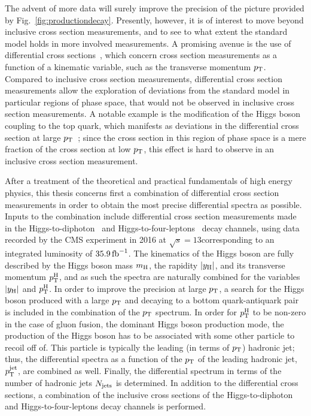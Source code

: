 The advent of more data will surely improve the precision of the picture provided by Fig.~\ref{fig:productiondecay}.
% 
Presently, however, it is of interest to move beyond inclusive cross section measurements, and to see to what extent the standard model holds in more involved measurements.
% 
A promising avenue is the use of differential cross sections~\cite{Aad:2014lwa,Khachatryan:2015rxa,Aad:2014tca,Khachatryan:2015yvw,Aad:2016lvc,Khachatryan:2016vnn,Aaboud:2018xdt,Sirunyan:2018kta,Aaboud:2017oem,Sirunyan:2017exp,Aaboud:2018ezd}, which concern cross section measurements as a function of a kinematic variable, such as the transverse momentum $p_\mathrm{T}$.
% 
Compared to inclusive cross section measurements, differential cross section measurements allow the exploration of deviations from the standard model in particular regions of phase space, that would not be observed in inclusive cross section measurements.
% 
A notable example is the modification of the Higgs boson coupling to the top quark, which manifests as deviations in the differential cross section at large $p_\mathrm{T}$~\cite{Grazzini:2017szg,Grazzini:2016paz}; since the cross section in this region of phase space is a mere fraction of the cross section at low $p_\mathrm{T}$, this effect is hard to observe in an inclusive cross section measurement.


After a treatment of the theoretical and practical fundamentals of high energy physics, this thesis concerns first a combination of differential cross section measurements in order to obtain the most precise differential spectra as possible.
% 
Inputs to the combination include differential cross section measurements made in the Higgs-to-diphoton~\cite{Sirunyan:2018kta} and Higgs-to-four-leptons~\cite{Sirunyan:2017exp} decay channels, using data recorded by the CMS experiment in 2016 at $\sqrt{s}=13$\TeV corresponding to an integrated luminosity of $35.9\,\text{fb}^{-1}$.
% 
The kinematics of the Higgs boson are fully described by the Higgs boson mass $m_{\mathrm{H}}$, the rapidity $\left|y_\mathrm{H}\right| $, and its transverse momentum $p_\mathrm{T}^\mathrm{H}$, and as such the spectra are naturally combined for the variables $\left|y_\mathrm{H}\right| $ and $p_\mathrm{T}^\mathrm{H}$.
% 
In order to improve the precision at large $p_\mathrm{T}$, a search for the Higgs boson produced with a large $p_\mathrm{T}$ and decaying to a bottom quark-antiquark pair~\cite{Sirunyan:2017dgc} is included in the combination of the $p_\mathrm{T}$ spectrum.
% 
% 
In order for $p_\mathrm{T}^\mathrm{H}$ to be non-zero in the case of gluon fusion, the dominant Higgs boson production mode, the production of the Higgs boson has to be associated with some other particle to recoil off of.
% 
This particle is typically the leading (in terms of $p_\mathrm{T}$) hadronic jet; thus, the differential spectra as a function of the $p_\mathrm{T}$ of the leading hadronic jet, $p_\mathrm{T}^\text{jet} $, are combined as well.
% 
Finally, the differential spectrum in terms of the number of hadronic jets $N_\text{jets} $ is determined.
% 
In addition to the differential cross sections, a combination of the inclusive cross sections of the  Higgs-to-diphoton and Higgs-to-four-leptons decay channels is performed.


